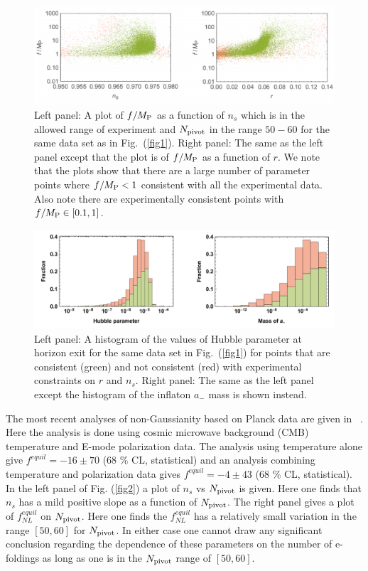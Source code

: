 \documentclass[a4paper,11pt]{article}
\begin{document}
  \begin{figure}
    \centering
    \includegraphics[width=1.0\textwidth]{figs/fig4.pdf}
    \caption{
      Left panel: A plot of $f / M_{\rm P}$ as a function of $n_s$ which is in the allowed range of
      experiment and $N_{\rm pivot}$ in the range $50-60$ for the same data set as in
      Fig.~(\ref{fig1}).
      Right panel: The same as the left panel except that the plot is of $f / M_{\rm P}$ as a
      function of $r$.
      We note that the plots show that there are a large number of parameter points where
      $f / M_{\rm P} < 1$ consistent with all the experimental data. Also note there are
      experimentally consistent points with $f/M_{\rm P} \in \left[0.1, 1\right]$.}
    \label{fig4}
  \end{figure}

  \begin{figure}
    \centering
    \includegraphics[width=1.0\textwidth]{figs/fig5.pdf}
    \caption{
      Left panel: A histogram of the values of Hubble parameter at horizon exit for the same
      data set in Fig.~(\ref{fig1}) for points that are consistent (green) and not consistent (red)
      with experimental constraints on $r$ and $n_s$.
      Right panel: The same as the left panel except the histogram of the inflaton $a_-$ mass is
      shown instead.}
    \label{fig5}
  \end{figure}

  The most recent analyses of non-Gaussianity based on Planck data are given in ~\cite{Ade:2015ava}.
  Here the analysis is done using cosmic microwave background (CMB) temperature and E-mode polarization 
  data. The  analysis using 
  temperature alone give $f^{equil} = -16 \pm 70$ (68 \% CL, statistical) and an analysis combining temperature and polarization data 
  gives $f^{equil} = -4 \pm 43$ (68 \% CL, statistical).
    In the left panel of Fig. (\ref{fig2})
  a plot of $n_s$ vs $N_{\rm pivot}$ is given. Here one finds that $n_s$ has a mild positive slope as a function of $N_{\rm pivot}$.
  The right panel gives a plot of $f^{equil}_{NL}$ on $N_{\rm pivot}$. Here one finds the $f^{equil}_{NL}$ has a relatively small variation in the range $[50,60]$ for
  $N_{\rm pivot}$. In either case one cannot draw any significant conclusion regarding the dependence of these parameters
  on the number of e-foldings as long as one is in the $N_{\rm pivot}$ range of $[50,60]$.
\end{document}
